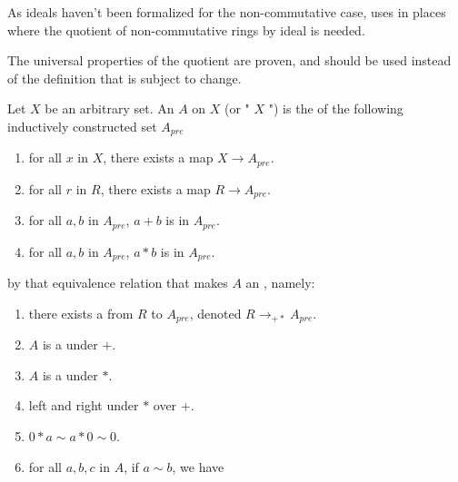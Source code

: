 \begin{remark}
    \label{mk:RingQuot}

    As ideals haven't been formalized for the non-commutative case, \Mathlib uses  in places
    where the quotient of non-commutative rings by ideal is needed.

    The universal properties of the quotient are proven, and should be used instead of the definition that is subject to change.
    
\end{remark}

\begin{definition}
    \label{FreeAlgebra}
    \leanok

    Let $X$ be an arbitrary set.
    An  $A$ on $X$ (or " $X$ ") is the  of the following inductively constructed set $A_{pre}$

    \begin{enumerate}

    \item for all $x$ in $X$, there exists a map $X \to A_{pre}$.
    \item for all $r$ in $R$, there exists a map $R \to A_{pre}$.
    \item for all $a, b$ in $A_{pre}$, $a + b$ is in $A_{pre}$.
    \item for all $a, b$ in $A_{pre}$, $a * b$ is in $A_{pre}$.
    
    \end{enumerate}

    by that equivalence relation that makes $A$ an , namely:

    \begin{enumerate}
    
    \item there exists a  from $R$ to $A_{pre}$, denoted $R \to_{+*} A_{pre}$.
    \item $A$ is a  under $+$.
    \item $A$ is a  under $*$.
    \item left and right  under $*$ over $+$.
    \item $0 * a \sim a * 0 \sim 0$.
    \item for all $a, b, c$ in $A$, if $a \sim b$, we have
    

\end{enumerate}
\end{definition}
